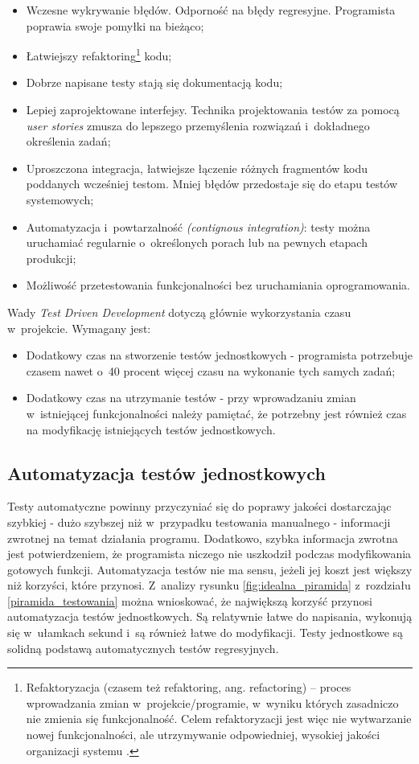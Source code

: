 \begin{itemize}
\item
Wczesne wykrywanie błędów. Odporność na błędy regresyjne. Programista poprawia swoje pomyłki na bieżąco;
\item
Łatwiejszy refaktoring\footnote{Refaktoryzacja (czasem też refaktoring, ang. refactoring) – proces wprowadzania zmian w~projekcie/programie, w~wyniku których zasadniczo nie zmienia się funkcjonalność. Celem refaktoryzacji jest więc nie wytwarzanie nowej funkcjonalności, ale utrzymywanie odpowiedniej, wysokiej jakości organizacji systemu \cite{website:wikipedia}.} kodu;
\item
Dobrze napisane testy stają się dokumentacją kodu;
\item
Lepiej zaprojektowane interfejsy. Technika projektowania testów za pomocą \textit{user stories} zmusza do lepszego przemyślenia rozwiązań i~dokładnego określenia zadań; 
\item
Uproszczona integracja, łatwiejsze łączenie różnych fragmentów kodu poddanych wcześniej testom. Mniej błędów przedostaje się do etapu testów systemowych;
\item
Automatyzacja i~powtarzalność \textit{(contignous integration)}: testy można uruchamiać regularnie o~określonych porach lub na pewnych etapach produkcji; 
\item
Możliwość przetestowania funkcjonalności bez uruchamiania oprogramowania.
\end{itemize}

Wady \textit{Test Driven Development} dotyczą głównie wykorzystania czasu w~projekcie. Wymagany jest:

\begin{itemize}
\item
Dodatkowy czas na stworzenie testów jednostkowych - programista potrzebuje czasem nawet o~40 procent więcej czasu na wykonanie tych samych zadań;
\item
Dodatkowy czas na utrzymanie testów - przy wprowadzaniu zmian w~istniejącej funkcjonalności należy pamiętać, że potrzebny jest również czas na modyfikację istniejących testów jednostkowych.
\end{itemize}

\subsection{Automatyzacja testów jednostkowych}
Testy automatyczne powinny przyczyniać się do poprawy jakości dostarczając szybkiej - dużo szybszej niż w~przypadku testowania manualnego - informacji zwrotnej na temat działania programu. Dodatkowo, szybka informacja zwrotna jest potwierdzeniem, że programista niczego nie uszkodził podczas modyfikowania gotowych funkcji.
Automatyzacja testów nie ma sensu, jeżeli jej koszt jest większy niż korzyści, które przynosi. Z~analizy rysunku \ref{fig:idealna_piramida} z~rozdziału \ref{piramida_testowania} można wnioskować, że największą korzyść przynosi automatyzacja testów jednostkowych. Są relatywnie łatwe do napisania, wykonują się w~ułamkach sekund i~są również łatwe do modyfikacji. Testy jednostkowe są solidną podstawą automatycznych testów regresyjnych.

